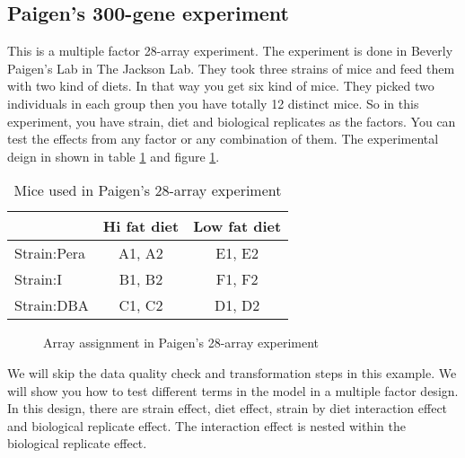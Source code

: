 \newpage
\subsection{Paigen's 300-gene experiment}
This is a multiple factor 28-array experiment. 
The experiment is done in Beverly Paigen's Lab in The Jackson Lab. 
They took three strains of mice and feed them with two kind of 
diets. In that way you get six kind of mice. They picked two
individuals in each group then you have totally 12 distinct mice.
So in this experiment, you have strain, diet and biological replicates
as the factors. You can test the effects from any factor or
any combination of them. 
The experimental deign in shown in table \ref{tbl:paigen} 
and figure \ref{fig:paigen}. 

\begin{table}[htb]
\centering
\begin{tabular}{|l|c|c|} \hline
& Hi fat diet & Low fat diet\\
 \hline
Strain:Pera & A1, A2 & E1, E2\\ \hline
Strain:I & B1, B2 & F1, F2\\ \hline
Strain:DBA & C1, C2 & D1, D2\\ \hline
\end{tabular}
\caption{Mice used in Paigen's 28-array experiment}
\label{tbl:paigen}
\end{table}

\begin{figure}[htbp]
\centering
\caption{Array assignment in Paigen's 28-array experiment}
\label{fig:paigen}
\end{figure}

We will skip the data quality check
and transformation steps in this example.
We will show you how to test different terms in the model
in a multiple factor design. In this design, there are strain
effect, diet effect, strain by diet interaction effect and
biological replicate effect. The interaction effect is nested
within the biological replicate effect.

